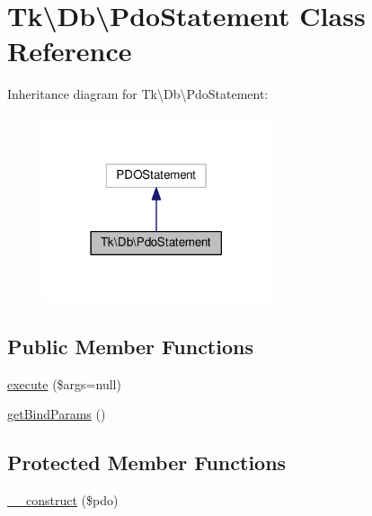 \hypertarget{classTk_1_1Db_1_1PdoStatement}{\section{Tk\textbackslash{}Db\textbackslash{}Pdo\+Statement Class Reference}
\label{classTk_1_1Db_1_1PdoStatement}
}


Inheritance diagram for Tk\textbackslash{}Db\textbackslash{}Pdo\+Statement\+:\nopagebreak
\begin{figure}[H]
\begin{center}
\leavevmode
\includegraphics[width=189pt]{classTk_1_1Db_1_1PdoStatement__inherit__graph}
\end{center}
\end{figure}
\subsection*{Public Member Functions}
\begin{DoxyCompactItemize}
\item 
\hyperlink{classTk_1_1Db_1_1PdoStatement_a47d7b8593feb03fc9820b0dbf6696a1e}{execute} (\$args=null)
\item 
\hyperlink{classTk_1_1Db_1_1PdoStatement_a99730138c42b55e4504b629a651cd575}{get\+Bind\+Params} ()
\end{DoxyCompactItemize}
\subsection*{Protected Member Functions}
\begin{DoxyCompactItemize}
\item 
\hyperlink{classTk_1_1Db_1_1PdoStatement_a131dbac928ba55ba6d465006bae18640}{\+\_\+\+\_\+construct} (\$pdo)
\end{DoxyCompactItemize}

